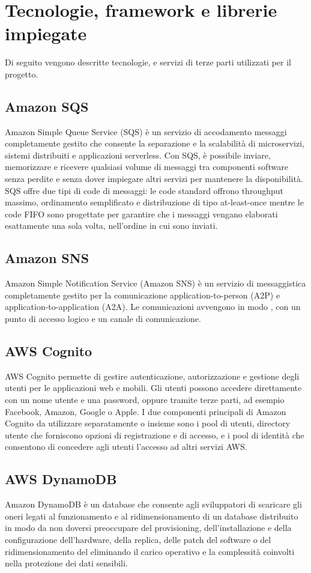 \section{Tecnologie, framework e librerie impiegate}\label{Tecnologie}
Di seguito vengono descritte tecnologie,  e servizi di terze parti utilizzati per il progetto.
\subsection{Amazon SQS}
Amazon Simple Queue Service (SQS) è un servizio di accodamento messaggi completamente gestito che consente la separazione e la scalabilità di microservizi, sistemi distribuiti e applicazioni serverless. Con SQS, è possibile inviare, memorizzare e ricevere qualsiasi volume di messaggi tra componenti software senza perdite e senza dover impiegare altri servizi per mantenere la disponibilità.
SQS offre due tipi di code di messaggi: le code standard offrono throughput massimo, ordinamento semplificato e distribuzione di tipo at-least-once mentre le code FIFO sono progettate per garantire che i messaggi vengano elaborati esattamente una sola volta, nell'ordine in cui sono inviati.
\subsection{Amazon SNS}
Amazon Simple Notification Service (Amazon SNS) è un servizio di messaggistica completamente gestito per la comunicazione application-to-person (A2P) e application-to-application (A2A).
Le comunicazioni avvengono in modo , con un punto di accesso logico e un canale di comunicazione.
\subsection{AWS Cognito}
AWS Cognito permette di gestire autenticazione, autorizzazione e gestione degli utenti per le applicazioni web e mobili. Gli utenti possono accedere direttamente con un nome utente e una password, oppure tramite terze parti, ad esempio Facebook, Amazon, Google o Apple.
I due componenti principali di Amazon Cognito da utilizzare separatamente o insieme sono i pool di utenti, directory utente che forniscono opzioni di registrazione e di accesso, e i pool di identità che consentono di concedere agli utenti l'accesso ad altri servizi AWS.
\subsection{AWS DynamoDB}
Amazon DynamoDB è un database  che consente agli sviluppatori di scaricare gli oneri legati al funzionamento e al ridimensionamento di un database distribuito in modo da non doversi preoccupare del provisioning, dell'installazione e della configurazione dell'hardware, della replica, delle patch del software o del ridimensionamento del  eliminando il carico operativo e la complessità coinvolti nella protezione dei dati sensibili.

